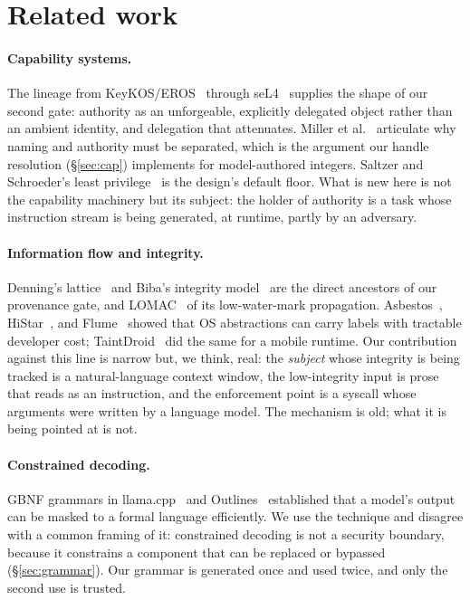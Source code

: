 \documentclass[11pt]{article}
\begin{document}
\section{Related work}
\label{sec:related}

\paragraph{Capability systems.} The lineage from
KeyKOS/EROS~\cite{shapiro1999eros} through seL4~\cite{klein2009sel4} supplies
the shape of our second gate: authority as an unforgeable, explicitly
delegated object rather than an ambient identity, and delegation that
attenuates. Miller et al.~\cite{miller2003myths} articulate why naming and
authority must be separated, which is the argument our handle resolution
(\S\ref{sec:cap}) implements for model-authored integers. Saltzer and
Schroeder's least privilege~\cite{saltzer1975protection} is the design's
default floor. What is new here is not the capability machinery but its
subject: the holder of authority is a task whose instruction stream is being
generated, at runtime, partly by an adversary.

\paragraph{Information flow and integrity.} Denning's
lattice~\cite{denning1976lattice} and Biba's integrity
model~\cite{biba1977integrity} are the direct ancestors of our provenance gate,
and LOMAC~\cite{fraser2000lomac} of its low-water-mark propagation.
Asbestos~\cite{efstathopoulos2005asbestos}, HiStar~\cite{zeldovich2006histar},
and Flume~\cite{krohn2007flume} showed that OS abstractions can carry labels
with tractable developer cost; TaintDroid~\cite{enck2010taintdroid} did the
same for a mobile runtime. Our contribution against this line is narrow but,
we think, real: the \emph{subject} whose integrity is being tracked is a
natural-language context window, the low-integrity input is prose that reads
as an instruction, and the enforcement point is a syscall whose arguments were
written by a language model. The mechanism is old; what it is being pointed at
is not.

\paragraph{Constrained decoding.} GBNF grammars in
llama.cpp~\cite{llamacpp} and Outlines~\cite{willard2023outlines} established
that a model's output can be masked to a formal language efficiently. We use
the technique and disagree with a common framing of it: constrained decoding is
not a security boundary, because it constrains a component that can be
replaced or bypassed (\S\ref{sec:grammar}). Our grammar is generated once and
used twice, and only the second use is trusted.
\end{document}
